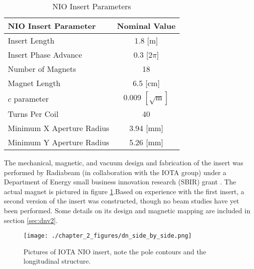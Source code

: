 \begin{table}
    \centering
    \begin{tabular}{lc}
    \toprule
    \textbf{NIO Insert Parameter} & \textbf{Nominal Value}\\
    \midrule
    Insert Length & 1.8 [m] \\
    Insert Phase Advance & 0.3 [2$\pi$] \\
    Number of Magnets  & 18 \\
    Magnet Length & 6.5 [cm] \\
    $c$ parameter & 0.009 $[\sqrt{\mathrm{m}}]$ \\
    Turns Per Coil & 40 \\
    Minimum X Aperture Radius& 3.94 [mm] \\
    Minimum Y Aperture Radius& 5.26 [mm]\\    
    \bottomrule
    \end{tabular}
    \caption{NIO Insert Parameters}
    \label{tab:dnParameters}
\end{table}

The mechanical, magnetic, and vacuum design and fabrication of the insert was performed by Radiabeam (in collaboration with the IOTA group) under a Department of Energy small business innovation research (SBIR) grant \cite{mcnevinMechanicalDesignManufacturing2016,osheaMeasurementNonLinearInsert2013,osheaNonLinearInsertsIOTA2017,osheaNonlinearMagneticInserts2015}. The actual magnet is pictured in figure \ref{fig:realDN}.Based on experience with the first insert, a second version of the insert was constructed, though no beam studies have yet been performed. Some details on its design and magnetic mapping are included in section \ref{sec:dnv2}.

\begin{figure}
	\centering
	\texttt{[image: ./chapter\_2\_figures/dn\_side\_by\_side.png]}
	\caption{Pictures of IOTA NIO insert, note the pole contours and the longitudinal structure.}
	\label{fig:realDN}
\end{figure}

